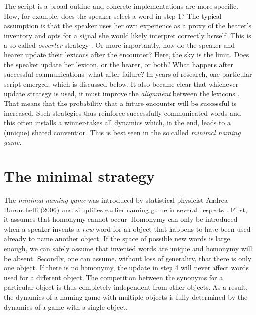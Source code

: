 \documentclass{../src/bcthesispart}
\begin{document}
The script is a broad outline and concrete implementations are more specific.
How, for example, does the speaker select a word in step 1?
The typical assumption is that the speaker uses her own experience as a proxy of the hearer’s inventory and opts for a signal she would likely interpret correctly herself.
This is a so called \emph{obverter} strategy \parencite{Oliphant1996}.
Or more importantly, how do the speaker and hearer update their lexicons after the encounter?
Here, the sky is the limit. 
Does the speaker update her lexicon, or the hearer, or both?
What happens after successful communications, what after failure?
In years of research, one particular script emerged, which is discussed below.
It also became clear that whichever update strategy is used, it must improve the \emph{alignment} between the lexicons \textcite{Steels2011}.
That means that the probability that a future encounter will be successful is increased.
Such strategies thus reinforce successfully communicated words and this often installs a winner-takes all dynamics which, in the end, leads to a (unique) shared convention.
This is best seen in the so called \emph{minimal naming game}.




\section{The minimal strategy}



The \emph{minimal naming game} was introduced by statistical physicist Andrea Baronchelli (2006)\nocite{Baronchelli2006} and simplifies earlier naming game in several respects \parencite{Baronchelli2006a}.
First, it assumes that homonymy cannot occur.
Homonymy can only be introduced when a speaker invents a \emph{new} word for an object that happens to have been used already to name another object. 
If the space of possible new words is large enough, we can safely assume that invented words are unique and homonymy will be absent.
Secondly, one can assume, without loss of generality, that there is only one object.
If there is no homonymy, the update in step 4 will never affect words used for a different object.
The competition between the synonyms for a particular object is thus completely independent from other objects.
As a result, the dynamics of a naming game with multiple objects is fully determined by the dynamics of a game with a single object.
\end{document}

